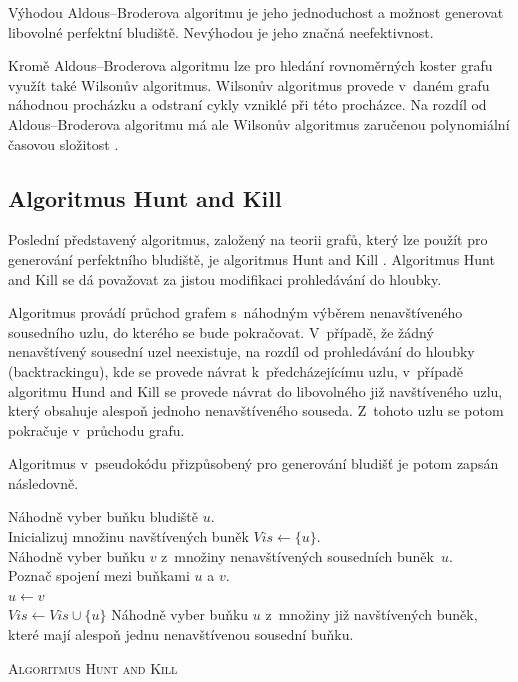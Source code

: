 \documentclass[a4paper,12pt]{article}
\begin{document}
\medskip

Výhodou Aldous--Broderova algoritmu je jeho jednoduchost a možnost generovat libovolné perfektní bludiště. Nevýhodou je jeho značná neefektivnost.

\enlargethispage*{0.5em}
Kromě Aldous--Broderova algoritmu lze pro hledání rovnoměrných koster grafu využít také Wilsonův algoritmus. Wilsonův algoritmus 
provede v~daném grafu náhodnou procházku a odstraní cykly vzniklé při této procházce. Na rozdíl od Aldous--Broderova algoritmu
má ale Wilsonův algoritmus zaručenou polynomiální časovou složitost \cite{span}.

\subsection{Algoritmus Hunt and Kill}
Poslední představený algoritmus, založený na teorii grafů, který lze použít pro generování perfektního bludiště, je algoritmus
Hunt and Kill \cite{fol}. Algoritmus Hunt and Kill se dá považovat za jistou modifikaci prohledávání do hloubky.

Algoritmus provádí průchod grafem s~náhodným výběrem nenavštíveného sousedního uzlu, do kterého se bude pokračovat. V~případě, že
žádný nenavštívený sousední uzel neexistuje, na rozdíl od prohledávání do hloubky (backtrackingu), kde se provede návrat k~předcházejícímu uzlu,
v~případě algoritmu Hund and Kill se provede návrat do libovolného již navštíveného uzlu, který obsahuje alespoň jednoho nenavštíveného souseda.
Z~tohoto uzlu se potom pokračuje v~průchodu grafu.

Algoritmus v~pseudokódu přizpůsobený pro generování bludišť je potom zapsán následovně.

\medskip

 \begin{algorithm}[H]
 \SetNlSty{}{}{:}
 \SetNlSkip{-1.0em}
 \SetInd{0.5em}{0.5em}
 \BlankLine
 \Indentp{1.7em}
   Náhodně vyber buňku bludiště $u$. \\
   Inicializuj množinu navštívených buněk $Vis \gets \{u\}$.\\
   {
     {
	Náhodně vyber buňku $v$ z~množiny nenavštívených sousedních buněk~$u$.\\
	Poznač spojení mezi buňkami $u$ a $v$. \\
	$u\gets v$ \\
	$Vis \gets Vis \cup \{u\}$
     }
     \Else
     {
        Náhodně vyber buňku $u$ z~množiny již navštívených buněk, které mají alespoň jednu nenavštívenou sousední buňku.
     }
     }
 \caption{\textsc{Algoritmus Hunt and Kill}}
 \label{alg:huntkill}
\end{algorithm}
\end{document}
